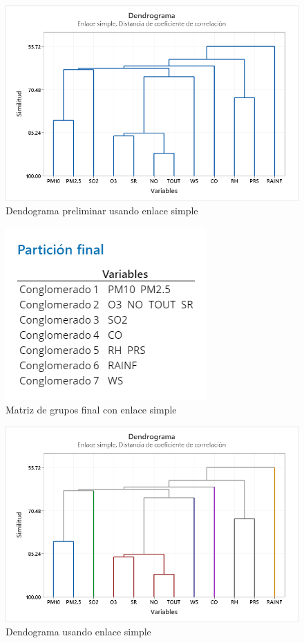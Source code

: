 \documentclass[journal, 10pt]{IEEEtran}                                                          %
\begin{document}
\begin{figure}[H]
    \centering
    \includegraphics[scale=.3]{gramaSimple.png}
    \caption{Dendograma preliminar usando enlace simple}
    \label{fig:gramaSimple}
\end{figure}

\begin{figure}[H]
    \centering
    \includegraphics[scale=.3]{matrizSimpleFinal.png}
    \caption{Matriz de grupos final con enlace simple}
    \label{fig:matrizSimpleFinal}
\end{figure}

\begin{figure}[H]
    \centering
    \includegraphics[scale=.3]{dendogramaSimple.png}
    \caption{Dendograma usando enlace simple}
    \label{fig:dendogramaSimple}
\end{figure}
\end{document}
